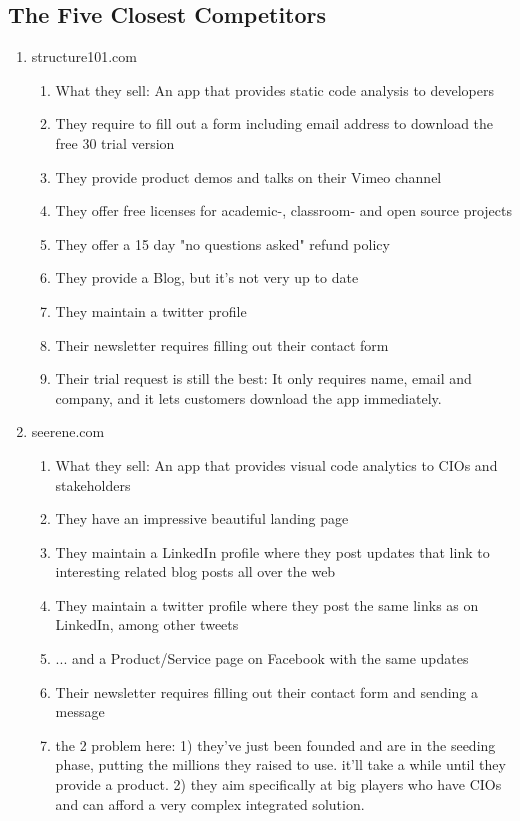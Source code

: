 \documentclass{article}
\begin{document}
\subsection{The Five Closest Competitors}

\begin{enumerate}
	\item structure101.com
	\begin{enumerate}
		\item What they sell: An app that provides static code analysis to developers
		\item They require to fill out a form including email address to download the free 30 trial version
		\item They provide product demos and talks on their Vimeo channel
		\item They offer free licenses for academic-, classroom- and open source projects 
		\item They offer a 15 day "no questions asked" refund policy
		\item They provide a Blog, but it's not very up to date
		\item They maintain a twitter profile
		\item Their newsletter requires filling out their contact form
		\item Their trial request is still the best: It only requires name, email and company, and it lets customers download the app immediately.
	\end{enumerate}
	\item seerene.com
	\begin{enumerate}
		\item What they sell: An app that provides visual code analytics to CIOs and stakeholders
		\item They have an impressive beautiful landing page
		\item They maintain a LinkedIn profile where they post updates that link to interesting related blog posts all over the web
		\item They maintain a twitter profile where they post the same links as on LinkedIn, among other tweets
		\item ... and a Product/Service page on Facebook with the same updates
		\item Their newsletter requires filling out their contact form and sending a message
		\item the 2 problem here: 1) they've just been founded and are in the seeding phase, putting the millions they raised to use. it'll take a while until they provide a product. 2) they aim specifically at big players who have CIOs and can afford a very complex integrated solution.

\end{enumerate}
\end{enumerate}
\end{document}
